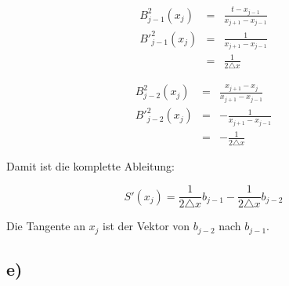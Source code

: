 \begin{eqnarray}
    B^2_{j-1}(x_j) &=& \frac{t - x_{j-1}}{x_{j+1} - x_{j-1}} \\
    B'^2_{j-1}(x_j)&=& \frac{1}{x_{j+1} - x_{j-1}}\\
    &=& \frac{1}{2 \triangle x}
\end{eqnarray}

\begin{eqnarray}
    B^2_{j-2}(x_j)&=& \frac{x_{j+1} - x_{j}}{x_{j+1} - x_{j-1}}\\
    B'^2_{j-2}(x_j)&=& -\frac{1}{x_{j+1} - x_{j-1}}\\
        &=& -\frac{1}{2 \triangle x}
\end{eqnarray}

Damit ist die komplette Ableitung:

\begin{equation}
    S'(x_j) =  \frac{1}{2 \triangle x} b_{j-1} - \frac{1}{2 \triangle x} b_{j-2}
\end{equation}

Die Tangente an $x_j$ ist der Vektor von $b_{j-2}$ nach $b_{j-1}$.
\subsection*{e)}


